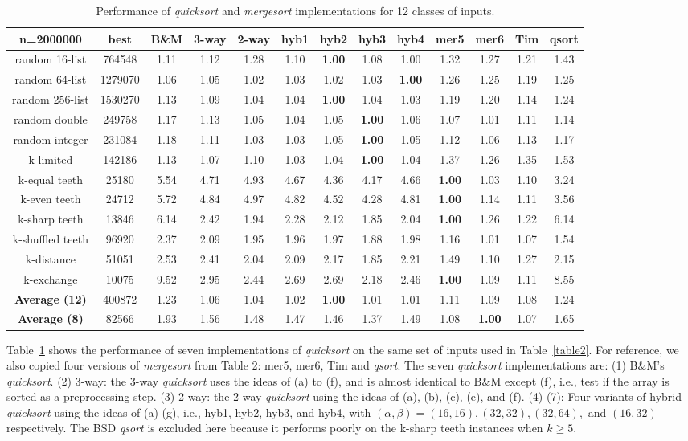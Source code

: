 \documentclass[AMA,STIX1COL]{WileyNJD-v2}
\newcommand{\qusort}{\emph{quicksort }}
\newcommand{\qusortn}{\emph{quicksort}}
\newcommand{\qsort}{\emph{qsort }}
\newcommand{\qsortn}{\emph{qsort}}
\newcommand{\msort}{\emph{mergesort }}
\begin{document}
\begin{table}
\caption{Performance of \qusort and \msort implementations for 12 classes of inputs.}
\centering
\begin{tabular}{|c|c|c|c|c|c|c|c|c|c|c|c|c|}
\toprule
n=2000000 & best  & B\&M & 3-way & 2-way & hyb1 & hyb2 & hyb3 & hyb4 & mer5& mer6 & Tim & qsort \\
\midrule
random 16-list	&764548	&1.11&	1.12&	1.28&	1.10&	\textbf{1.00}&	1.08&	1.00&	1.32&	1.27&	1.21&	1.43\\
random 64-list&	1279070	&1.06	&1.05	&1.02	&1.03	&1.02	&1.03	&\textbf{1.00}	&1.26	&1.25	&1.19	&1.25\\
random 256-list&	1530270&	1.13&	1.09&	1.04&	1.04& \textbf{1.00}&	1.04&	1.03&	1.19&	1.20&	1.14&	1.24\\
random double&	249758	&1.17	&1.13	&1.05	&1.04	&1.05	&\textbf{1.00}	&1.06	&1.07	&1.01	&1.11	&1.14\\
random integer&	231084&	1.18&	1.11&	1.03&	1.03&	1.05&	\textbf{1.00}&	1.05&	1.12&	1.06&	1.13&	1.17\\
k-limited&	142186	&1.13	&1.07	&1.10	&1.03	&1.04	&\textbf{1.00}	&1.04	&1.37	&1.26	&1.35	&1.53\\
k-equal teeth&	25180&	5.54&	4.71&	4.93&	4.67&	4.36&	4.17&	4.66&	\textbf{1.00}&	1.03&	1.10&	3.24\\
k-even teeth&	24712	&5.72	&4.84	&4.97	&4.82	&4.52	&4.28	&4.81	&\textbf{1.00}	&1.14	&1.11&	3.56\\
k-sharp teeth&	13846	&6.14&	2.42&	1.94&	2.28&	2.12&	1.85&	2.04&	\textbf{1.00}&	1.26&	1.22&	6.14\\
k-shuffled teeth&	96920	&2.37	&2.09	&1.95	&1.96	&1.97	&1.88	&1.98	&1.16	&1.01	&1.07	&1.54\\
k-distance&	51051	&2.53&	2.41&	2.04&	2.09&	2.17&	1.85&	2.21&	1.49&	1.10&	1.27&	2.15\\
k-exchange&	10075	&9.52	&2.95	&2.44	&2.69	&2.69	&2.18	&2.46	&\textbf{1.00}	&1.09	&1.11	&8.55\\
\textbf{Average  (12)}&	400872&	1.23&	1.06&	1.04&	1.02&	\textbf{1.00}&	1.01&	1.01&	1.11&	1.09&	1.08&	1.24\\
\textbf{Average  (8)}&	82566	&1.93	&1.56	&1.48	&1.47	&1.46	&1.37	&1.49	&1.08	&\textbf{1.00}	&1.07	&1.65\\
\bottomrule
\end{tabular}
\label{table3}
\end{table}

Table~\ref{table3} shows the performance of seven implementations of \qusort on the same set of inputs used in Table~\ref{table2}. 
For reference, we also copied four versions of \msort from Table 2: mer5, mer6, Tim and \qsortn. 
The seven \qusort implementations are: (1) B\&M's \qusortn. (2) 3-way: the 3-way \qusort uses the ideas of (a) to (f), and is almost identical to B\&M except (f), i.e., test if the array is sorted as a preprocessing step. (3) 2-way: the 2-way \qusort using the ideas of (a), (b), (c), (e), and (f). (4)-(7): Four variants of hybrid \qusort using the ideas of (a)-(g), i.e., hyb1, hyb2, hyb3, and hyb4, with $(\alpha, \beta) = (16, 16), (32, 32), (32, 64),$ and $(16, 32)$ respectively. 
The BSD \qsort is excluded here because it performs poorly on the k-sharp teeth instances when $k \geq 5$.
\end{document}
